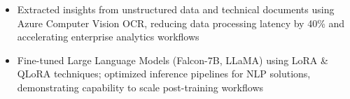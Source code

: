 \documentclass[10pt]{article}
\begin{document}
\begin{itemize}[left=0pt, itemsep=0pt]
    \item Extracted insights from unstructured data and technical documents using Azure Computer Vision OCR, reducing data processing latency by 40\% and accelerating enterprise analytics workflows
    \item Fine-tuned Large Language Models (Falcon-7B, LLaMA) using LoRA \& QLoRA techniques; optimized inference pipelines for NLP solutions, demonstrating capability to scale post-training workflows

\end{itemize}



\end{document}
